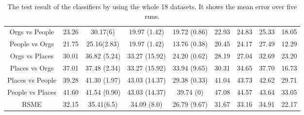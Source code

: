 \begin{table}[h]
{\begin{tabular}{@{}ccccccccc@{}}
			Orgs vs People         & 23.26 & 30.17(6)   &  19.97 (1.42)	    & 19.72  (0.86)        & 22.93 & 24.83 & 25.33 & 18.05 \\
			People vs Orgs         & 21.75 & 25.16(2.83) & 19.97 (1.42)	    & 13.76 (0.38)         & 20.45 & 24.17 & 27.49 & 12.29 \\
			Orgs vs Places         & 30.01 & 36.82 (5.24)& 33.27 (15.92)    & 24.20  (0.62)        & 28.19 & 27.04 & 32.69 & 23.20 \\
			Places vs Orgs         & 37.01 & 37.48 (2.34)& 33.27 (15.92)    & 33.94  (9.65)        & 30.31 & 34.65 & 37.70 & 16.73 \\
			Places vs People       & 39.28 & 41.30 (1.97)& 43.03 (14.37)    & 29.38   (0.33)       & 41.04 & 43.73 & 42.62 & 29.71 \\
			People vs Places       & 41.60 & 41.54 (0.90)& 43.03 (14.37)    & 39.74    (0)      & 47.08 & 44.57 & 43.64 & 33.05 \\\midrule
			RSME                   & 32.15 & 35.41(6.5) & 34.09 (8.0)    & 26.79 (9.67)         & 31.67 & 33.16 & 34.91 & 22.17 \\ \bottomrule
	\end{tabular}}
	\caption[Complete Dataset Result of Error]{The test result of the classifiers by using the whole 18 datasets. It shows the mean error over five runs.\label{BTableCompleteErr}}
\end{table}


